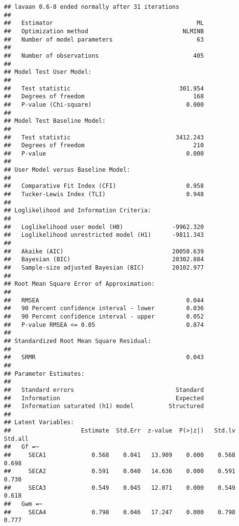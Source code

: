 \documentclass[
]{article}
\begin{document}
\begin{verbatim}
## lavaan 0.6-8 ended normally after 31 iterations
## 
##   Estimator                                         ML
##   Optimization method                           NLMINB
##   Number of model parameters                        63
##                                                       
##   Number of observations                           405
##                                                       
## Model Test User Model:
##                                                       
##   Test statistic                               301.954
##   Degrees of freedom                               168
##   P-value (Chi-square)                           0.000
## 
## Model Test Baseline Model:
## 
##   Test statistic                              3412.243
##   Degrees of freedom                               210
##   P-value                                        0.000
## 
## User Model versus Baseline Model:
## 
##   Comparative Fit Index (CFI)                    0.958
##   Tucker-Lewis Index (TLI)                       0.948
## 
## Loglikelihood and Information Criteria:
## 
##   Loglikelihood user model (H0)              -9962.320
##   Loglikelihood unrestricted model (H1)      -9811.343
##                                                       
##   Akaike (AIC)                               20050.639
##   Bayesian (BIC)                             20302.884
##   Sample-size adjusted Bayesian (BIC)        20102.977
## 
## Root Mean Square Error of Approximation:
## 
##   RMSEA                                          0.044
##   90 Percent confidence interval - lower         0.036
##   90 Percent confidence interval - upper         0.052
##   P-value RMSEA <= 0.05                          0.874
## 
## Standardized Root Mean Square Residual:
## 
##   SRMR                                           0.043
## 
## Parameter Estimates:
## 
##   Standard errors                             Standard
##   Information                                 Expected
##   Information saturated (h1) model          Structured
## 
## Latent Variables:
##                    Estimate  Std.Err  z-value  P(>|z|)   Std.lv  Std.all
##   Gf =~                                                                 
##     SECA1             0.568    0.041   13.909    0.000    0.568    0.698
##     SECA2             0.591    0.040   14.636    0.000    0.591    0.730
##     SECA3             0.549    0.045   12.071    0.000    0.549    0.618
##   Gwm =~                                                                
##     SECA4             0.798    0.046   17.247    0.000    0.798    0.777

\end{verbatim}
\end{document}
